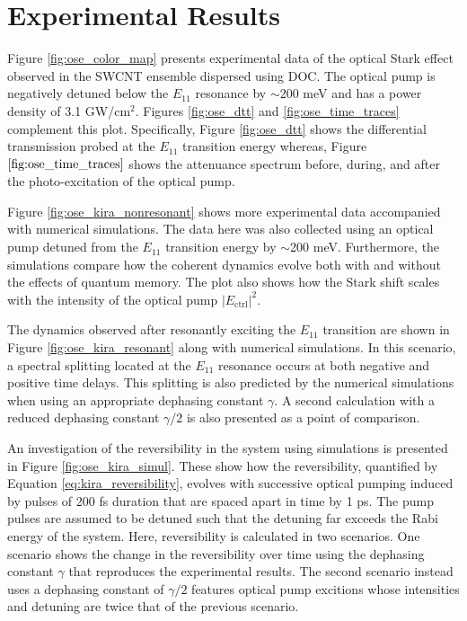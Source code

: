 \section{Experimental Results}

Figure \ref{fig:ose_color_map} presents experimental data of the optical Stark effect observed in the SWCNT ensemble dispersed using DOC. The optical pump is negatively detuned below the $E_{11}$ resonance by $\sim 200$ meV and has a power density of 3.1 GW/cm$^2$. Figures \ref{fig:ose_dtt} and \ref{fig:ose_time_traces} complement this plot. Specifically, Figure \ref{fig:ose_dtt} shows the differential transmission probed at the $E_{11}$ transition energy whereas, Figure $\ref{fig:ose_time_traces}$ shows the attenuance spectrum before, during, and after the photo-excitation of the optical pump.

Figure \ref{fig:ose_kira_nonresonant} shows more experimental data accompanied with numerical simulations. The data here was also collected using an optical pump detuned from the $E_{11}$ transition energy by $\sim$200 meV. Furthermore, the simulations compare how the coherent dynamics evolve both with and without the effects of quantum memory. The plot also shows how the Stark shift scales with the intensity of the optical pump $|E_\text{ctrl}|^2$.

The dynamics observed after resonantly exciting the $E_{11}$ transition are shown in Figure \ref{fig:ose_kira_resonant} along with numerical simulations. In this scenario, a spectral splitting located at the $E_{11}$ resonance occurs at both negative and positive time delays. This splitting is also predicted by the numerical simulations when using an appropriate dephasing constant $\gamma$. A second calculation with a reduced dephasing constant $\gamma/2$ is also presented as a point of comparison.

An investigation of the reversibility in the system using simulations is presented in Figure \ref{fig:ose_kira_simul}. These show how the reversibility, quantified by Equation \eqref{eq:kira_reversibility}, evolves with successive optical pumping induced by pulses of 200 fs duration that are spaced apart in time by 1 ps. The pump pulses are assumed to be detuned such that the detuning far exceeds the Rabi energy of the system. Here, reversibility is calculated in two scenarios. One scenario shows the change in the reversibility over time using the dephasing constant $\gamma$ that reproduces the experimental results. The second scenario instead uses a dephasing constant of $\gamma/2$ features optical pump excitions whose intensities and detuning are twice that of the previous scenario.

